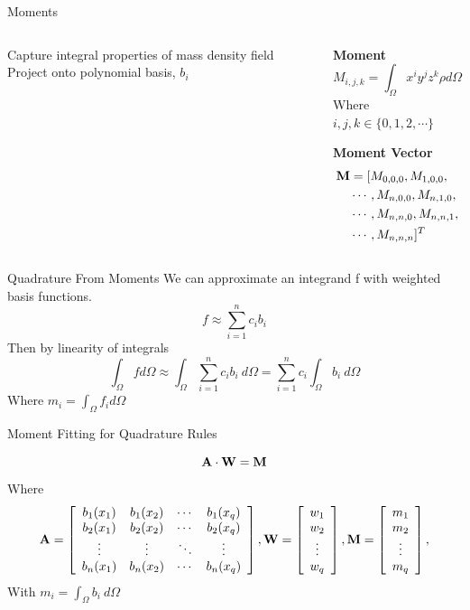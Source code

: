 \placelogofalse
\begin{frame}{Moments}
\begin{columns}
\begin{center}
\begin{outline}
\1 Capture integral properties of mass density field
\2 Project onto polynomial basis, $b_i$
\end{outline}
\end{center}

\begin{center}
  \textbf{Moment}
  $$
  M_{i,j,k} = \int_{\Omega} x^i y^j z^k \rho d\Omega
  $$
  Where $i, j, k \in \{0, 1, 2, \cdots\}$

  \vspace{1.5cm}

  \textbf{Moment Vector}
  \begin{align*}
    \bf{M} &= [M_{0,0,0}, M_{1, 0, 0},\\
      & \cdots, M_{n, 0, 0}, M_{n, 1, 0},\\
      & \cdots, M_{n, n, 0}, M_{n, n, 1},\\
      & \cdots, M_{n,n,n}]^T
  \end{align*}
\end{center}
\end{columns}
\end{frame}
\placelogotrue

\begin{frame}{Quadrature From Moments}
We can approximate an integrand f with weighted basis functions.
$$
f \approx \sum_{i = 1}^n c_i b_i
$$
Then by linearity of integrals
$$
\int_{\Omega} f d\Omega \approx \int_{\Omega} \sum_{i = 1}^n c_i b_i \ d \Omega
= \sum_{i=1}^n c_i \int_{\Omega} b_i \ d \Omega
$$
Where $m_i = \int_{\Omega} f_i d \Omega$
\end{frame}

\begin{frame}{Moment Fitting for Quadrature Rules}
\centering
\begin{center}
$$
\bf{A} \cdot \bf{W} = \bf{M}
$$
Where
$$
\bf{A} = \left[
\begin{array}{cccc}
  b_1(x_1) & b_1(x_2) & \cdots & b_1(x_q) \\
  b_2(x_1) & b_2(x_2) & \cdots & b_2(x_q) \\
  \vdots & \vdots & \ddots & \vdots \\
  b_n(x_1) & b_n(x_2) & \cdots & b_n(x_q) \\
\end{array}\right],
W = \left[
  \begin{array}{c}
    w_1 \\ w_2 \\ \vdots \\ w_q
  \end{array}
\right],
M = \left[
  \begin{array}{c}
    m_1 \\ m_2 \\ \vdots \\ m_q
  \end{array}
\right],
$$
With $m_i = \int_{\Omega} b_i \ d\Omega$
\end{center}
\end{frame}

